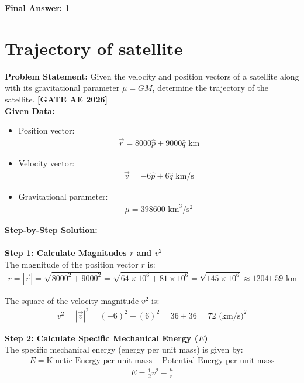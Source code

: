 \documentclass[journal,12pt,onecolumn]{IEEEtran}
\newcommand{\brak}[1]{\left(#1\right)}
\theoremstyle{remark}
\begin{document}
\noindent \textbf{Final Answer:} \textbf{1}
\newpage


\section{Trajectory of satellite}

\noindent \textbf{Problem Statement:} Given the velocity and position vectors of a satellite along with its gravitational parameter $\mu=GM$, determine the trajectory of the satellite. \hfill \textbf{[GATE AE 2026]}\\ 
\textbf{Given Data:}
\begin{itemize}
    \item Position vector: 
    \begin{align}
    \vec{r} = 8000\hat{p} + 9000\hat{q} \text{ km}
    \end{align}
    \item Velocity vector:
    \begin{align}
    \vec{v} = -6\hat{p} + 6\hat{q} \text{ km/s}
    \end{align}
    \item Gravitational parameter: 
    \begin{align}
    \mu = 398600 \text{ km}^3/\text{s}^2
    \end{align}
\end{itemize}
\noindent \textbf{Step-by-Step Solution:}\\ \\

\noindent \textbf{Step 1: Calculate Magnitudes $r$ and $v^2$}\\
The magnitude of the position vector $r$ is:
\begin{align}
r = |\vec{r}| = \sqrt{8000^2 + 9000^2} = \sqrt{64 \times 10^6 + 81 \times 10^6} = \sqrt{145 \times 10^6} \approx 12041.59 \text{ km}
\end{align}

\noindent The square of the velocity magnitude $v^2$ is:
\begin{align}
v^2 = |\vec{v}|^2 = \brak{-6}^2 + \brak{6}^2 = 36 + 36 = 72 \text{ (km/s)}^2
\end{align}

\noindent \textbf{Step 2: Calculate Specific Mechanical Energy ($E$)}\\

\noindent The specific mechanical energy (energy per unit mass) is given by:
\noindent
\begin{align}
E = \text{Kinetic Energy per unit mass} + \text{Potential Energy per unit mass}
\end{align}
\begin{align}
E = \frac{1}{2}v^2 - \frac{\mu}{r}
\end{align}
\end{document}

